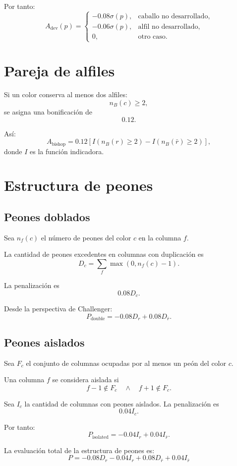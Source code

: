 \documentclass[11pt,a4paper]{article}
\begin{document}
Por tanto:
\[
A_{\mathrm{dev}}(p)
=
\begin{cases}
-0.08\sigma(p), & \text{caballo no desarrollado},\\
-0.06\sigma(p), & \text{alfil no desarrollado},\\
0, & \text{otro caso}.
\end{cases}
\]

\section{Pareja de alfiles}

Si un color conserva al menos dos alfiles:
\[
n_B(c)\ge 2,
\]
se asigna una bonificación de
\[
0.12.
\]

Así:
\[
A_{\mathrm{bishop}}
=
0.12
\left[
I(n_B(r)\ge2)
-
I(n_B(\bar r)\ge2)
\right],
\]
donde $I$ es la función indicadora.

\section{Estructura de peones}

\subsection{Peones doblados}

Sea $n_f(c)$ el número de peones del color $c$ en la columna $f$.

La cantidad de peones excedentes en columnas con duplicación es
\[
D_c=
\sum_f \max(0,n_f(c)-1).
\]

La penalización es
\[
0.08D_c.
\]

Desde la perspectiva de Challenger:
\[
P_{\mathrm{double}}
=
-0.08D_r
+
0.08D_{\bar r}.
\]

\subsection{Peones aislados}

Sea $F_c$ el conjunto de columnas ocupadas por al menos un peón del color $c$.

Una columna $f$ se considera aislada si
\[
f-1\notin F_c
\quad\land\quad
f+1\notin F_c.
\]

Sea $I_c$ la cantidad de columnas con peones aislados. La penalización es
\[
0.04I_c.
\]

Por tanto:
\[
P_{\mathrm{isolated}}
=
-0.04I_r
+
0.04I_{\bar r}.
\]

La evaluación total de la estructura de peones es:
\[
\boxed{
P=
-0.08D_r
-0.04I_r
+0.08D_{\bar r}
+0.04I_{\bar r}
}
\]
\end{document}
